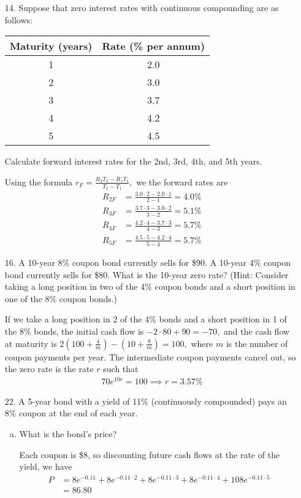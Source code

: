 \documentclass{article}
\begin{document}
\begin{itemize}
	\item[14.] Suppose that zero interest rates with continuous compounding are as follows:
		\begin{center}
			\begin{tabular}{cc}
				Maturity (years) & Rate (\% per annum) \\
				\hline
				1 & 2.0 \\
				2 & 3.0 \\
				3 & 3.7 \\
				4 & 4.2 \\
				5 & 4.5
			\end{tabular}
		\end{center}
		Calculate forward interest rates for the 2nd, 3rd, 4th, and 5th years.
		\begin{soln}
			Using the formula $r_F=\frac{R_2T_2-R_1T_1}{T_2-T_1},$ we the forward rates are
			\begin{align*}
				R_{2F} &= \frac{3.0\cdot 2-2.0\cdot 1}{2-1} = 4.0\% \\
				R_{3F} &= \frac{3.7\cdot3-3.0\cdot2}{3-2} = 5.1\% \\
				R_{4F} &= \frac{4.2\cdot 4-3.7\cdot3}{4-3} = 5.7\% \\
				R_{5F} &= \frac{4.5\cdot5-4.2\cdot 4}{5-4} = 5.7\%
			\end{align*}
		\end{soln}

	\item[16.] A 10-year 8\% coupon bond currently sells for \$90. A 10-year 4\% coupon bond currently sells for \$80. What is the 10-year zero rate? (Hint: Consider taking a long position in two of the 4\% coupon bonds and a short position in one of the 8\% coupon bonds.)
		\begin{soln}
			If we take a long position in 2 of the 4\% bonds and a short position in 1 of the 8\% bonds, the initial cash flow is $-2\cdot 80 + 90 = -70,$ and the cash flow at maturity is $2\left( 100+\frac{4}{m} \right)-\left( 10+\frac{8}{m} \right) = 100,$ where $m$ is the number of coupon payments per year. The intermediate coupon payments cancel out, so the zero rate is the rate $r$ such that
			\begin{align*}
				70e^{10r} = 100 \implies r = 3.57\%
			\end{align*}
		\end{soln}

	\item[22.] A 5-year bond with a yield of 11\% (continuously compounded) pays an 8\% coupon at the end of each year.
		\begin{enumerate}[(a)]
			\item What is the bond's price?
				\begin{soln}
					Each coupon is \$8, so discounting future cash flows at the rate of the yield, we have
					\begin{align*}
						P &= 8e^{-0.11}+8e^{-0.11\cdot2}+8e^{-0.11\cdot3}+8e^{-0.11\cdot4}+108e^{-0.11\cdot5} \\
						&= 86.80
					\end{align*}
				\end{soln}


\end{enumerate}
\end{itemize}
\end{document}
